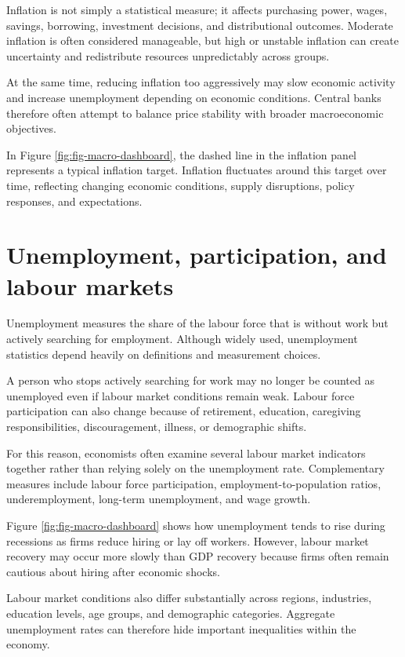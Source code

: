\documentclass[
  11pt,
  oneside]{book}
\begin{document}
Inflation is not simply a statistical measure; it affects purchasing power, wages, savings, borrowing, investment decisions, and distributional outcomes. Moderate inflation is often considered manageable, but high or unstable inflation can create uncertainty and redistribute resources unpredictably across groups.

At the same time, reducing inflation too aggressively may slow economic activity and increase unemployment depending on economic conditions. Central banks therefore often attempt to balance price stability with broader macroeconomic objectives.

In Figure \ref{fig:fig-macro-dashboard}, the dashed line in the inflation panel represents a typical inflation target. Inflation fluctuates around this target over time, reflecting changing economic conditions, supply disruptions, policy responses, and expectations.

\section{Unemployment, participation, and labour markets}\label{unemployment-participation-and-labour-markets}

Unemployment measures the share of the labour force that is without work but actively searching for employment. Although widely used, unemployment statistics depend heavily on definitions and measurement choices.

A person who stops actively searching for work may no longer be counted as unemployed even if labour market conditions remain weak. Labour force participation can also change because of retirement, education, caregiving responsibilities, discouragement, illness, or demographic shifts.

For this reason, economists often examine several labour market indicators together rather than relying solely on the unemployment rate. Complementary measures include labour force participation, employment-to-population ratios, underemployment, long-term unemployment, and wage growth.

Figure \ref{fig:fig-macro-dashboard} shows how unemployment tends to rise during recessions as firms reduce hiring or lay off workers. However, labour market recovery may occur more slowly than GDP recovery because firms often remain cautious about hiring after economic shocks.

Labour market conditions also differ substantially across regions, industries, education levels, age groups, and demographic categories. Aggregate unemployment rates can therefore hide important inequalities within the economy.
\end{document}
